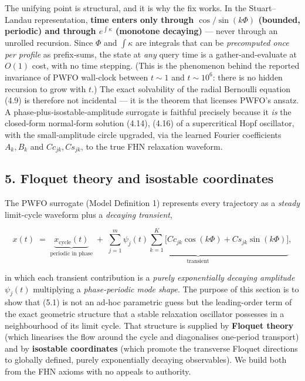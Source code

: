 \documentclass[
  11pt,
]{article}
\begin{document}
The unifying point is structural, and it is why the fix works. In the
Stuart--Landau representation, \textbf{time enters only through
\(\cos/\sin(k\Phi)\) (bounded, periodic) and through \(e^{\int\kappa}\)
(monotone decaying)} --- never through an unrolled recursion. Since
\(\Phi\) and \(\int\kappa\) are integrals that can be \emph{precomputed
once per profile} as prefix‑sums, the state at \emph{any} query time is
a gather‑and‑evaluate at \(O(1)\) cost, with no time stepping. (This is
the phenomenon behind the reported invariance of PWFO wall‑clock between
\(t\!\sim\!1\) and \(t\!\sim\!10^6\): there is no hidden recursion to
grow with \(t\).) The exact solvability of the radial Bernoulli equation
(4.9) is therefore not incidental --- it is the theorem that licenses
PWFO's ansatz. A phase‑plus‑isostable‑amplitude surrogate is faithful
precisely because it \emph{is} the closed‑form normal‑form solution
(4.14), (4.16) of a supercritical Hopf oscillator, with the
small‑amplitude circle upgraded, via the learned Fourier coefficients
\(A_k,B_k\) and \(Cc_{jk},Cs_{jk}\), to the true FHN relaxation
waveform.

\subsection{5. Floquet theory and isostable
coordinates}\label{floquet-theory-and-isostable-coordinates}

The PWFO surrogate (Model Definition 1) represents every trajectory as a
\emph{steady} limit-cycle waveform plus a \emph{decaying transient},

\[
x(t) \;=\; \underbrace{x_{\text{cycle}}(t)}_{\text{periodic in phase}} \;+\; \underbrace{\sum_{j=1}^{m}\psi_j(t)\sum_{k=1}^{K}\!\big[Cc_{jk}\cos(k\Phi)+Cs_{jk}\sin(k\Phi)\big]}_{\text{transient}} ,
\tag{5.1}
\]

in which each transient contribution is a \emph{purely exponentially
decaying amplitude} \(\psi_j(t)\) multiplying a \emph{phase-periodic
mode shape}. The purpose of this section is to show that (5.1) is not an
ad-hoc parametric guess but the leading-order term of the exact
geometric structure that a stable relaxation oscillator possesses in a
neighbourhood of its limit cycle. That structure is supplied by
\textbf{Floquet theory} (which linearises the flow around the cycle and
diagonalises one-period transport) and by \textbf{isostable coordinates}
(which promote the transverse Floquet directions to globally defined,
purely exponentially decaying observables). We build both from the FHN
axioms with no appeals to authority.
\end{document}

